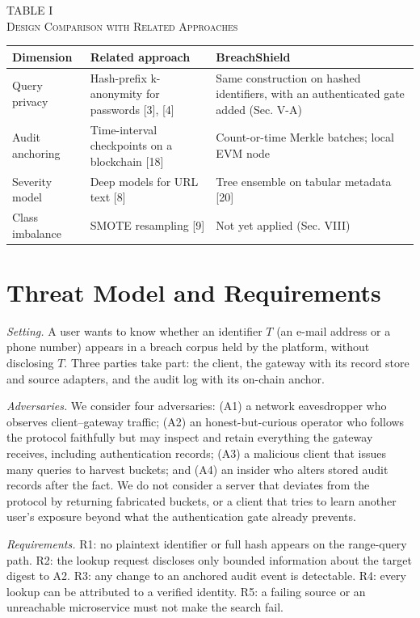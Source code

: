 \documentclass[10pt,twocolumn]{article}
\newcommand{\tcap}[2]{\begin{center}\footnotesize TABLE #1\\[1pt]\scshape #2\end{center}\vspace{-8pt}}
\begin{document}
\begin{table}[!t]
\centering
\tcap{I}{Design Comparison with Related Approaches}
\footnotesize
\setlength{\tabcolsep}{3pt}
\begin{tabular}{|p{}|p{}|p{}|}
\hline
\textbf{Dimension} & \textbf{Related approach} & \textbf{BreachShield}\\
\hline
Query privacy & Hash-prefix k-anonymity for passwords [3], [4] & Same construction on hashed identifiers, with an authenticated gate added (Sec. V-A)\\
\hline
Audit anchoring & Time-interval checkpoints on a blockchain [18] & Count-or-time Merkle batches; local EVM node\\
\hline
Severity model & Deep models for URL text [8] & Tree ensemble on tabular metadata [20]\\
\hline
Class imbalance & SMOTE resampling [9] & Not yet applied (Sec. VIII)\\
\hline
\end{tabular}
\end{table}

\section{Threat Model and Requirements}

\textit{Setting.} A user wants to know whether an identifier $T$ (an e-mail address or a phone number) appears in a breach corpus held by the platform, without disclosing $T$. Three parties take part: the client, the gateway with its record store and source adapters, and the audit log with its on-chain anchor.

\textit{Adversaries.} We consider four adversaries: (A1) a network eavesdropper who observes client--gateway traffic; (A2) an honest-but-curious operator who follows the protocol faithfully but may inspect and retain everything the gateway receives, including authentication records; (A3) a malicious client that issues many queries to harvest buckets; and (A4) an insider who alters stored audit records after the fact. We do not consider a server that deviates from the protocol by returning fabricated buckets, or a client that tries to learn another user's exposure beyond what the authentication gate already prevents.

\textit{Requirements.} R1: no plaintext identifier or full hash appears on the range-query path. R2: the lookup request discloses only bounded information about the target digest to A2. R3: any change to an anchored audit event is detectable. R4: every lookup can be attributed to a verified identity. R5: a failing source or an unreachable microservice must not make the search fail.
\end{document}

